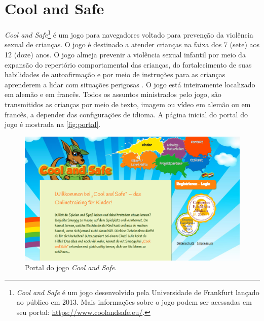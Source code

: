 

\section{Cool and Safe}\label{sssec:CeS}

\textit{Cool and Safe}\footnote{\textit{Cool and Safe} é um jogo desenvolvido pela Universidade de Frankfurt lançado ao público em 2013. Mais informações sobre o jogo podem ser acessadas em seu portal: \url{https://www.coolandsafe.eu/}.} é um jogo para navegadores voltado para prevenção da violência sexual de crianças. O jogo é destinado a atender crianças na faixa dos 7 (sete) aos 12 (doze) anos. O jogo almeja prevenir a violência sexual infantil por meio da expansão do repertório comportamental das crianças, do fortalecimento de suas habilidades de autoafirmação e por meio de instruções para as crianças aprenderem a lidar com situações perigosas \cite{pajala2018compiled}. O jogo está inteiramente localizado em alemão e em francês. Todos os assuntos ministrados pelo jogo, são transmitidos as crianças por meio de texto, imagem ou vídeo em alemão ou em francês, a depender das configurações de idioma. A página inicial do portal do jogo é mostrada na \autoref{fig:portal}.

\begin{figure}[htb]

	\caption{\label{fig:portal}Portal do jogo \textit{Cool and Safe}.}
  \begin{center}%
    \includegraphics[width=\linewidth]{./Visuais/Cool/coolSafe.png}
	\end{center}%

\end{figure}

